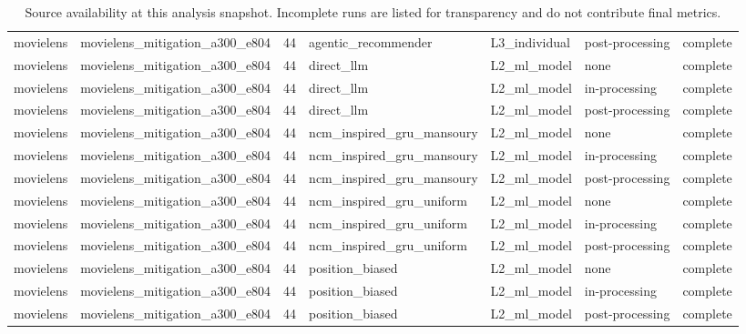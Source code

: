 \begin{table}[htbp!]
\begin{tabular}{llrllll}
movielens & movielens\_mitigation\_a300\_e804 & 44 & agentic\_recommender & L3\_individual & post-processing & complete \\
movielens & movielens\_mitigation\_a300\_e804 & 44 & direct\_llm & L2\_ml\_model & none & complete \\
movielens & movielens\_mitigation\_a300\_e804 & 44 & direct\_llm & L2\_ml\_model & in-processing & complete \\
movielens & movielens\_mitigation\_a300\_e804 & 44 & direct\_llm & L2\_ml\_model & post-processing & complete \\
movielens & movielens\_mitigation\_a300\_e804 & 44 & ncm\_inspired\_gru\_mansoury & L2\_ml\_model & none & complete \\
movielens & movielens\_mitigation\_a300\_e804 & 44 & ncm\_inspired\_gru\_mansoury & L2\_ml\_model & in-processing & complete \\
movielens & movielens\_mitigation\_a300\_e804 & 44 & ncm\_inspired\_gru\_mansoury & L2\_ml\_model & post-processing & complete \\
movielens & movielens\_mitigation\_a300\_e804 & 44 & ncm\_inspired\_gru\_uniform & L2\_ml\_model & none & complete \\
movielens & movielens\_mitigation\_a300\_e804 & 44 & ncm\_inspired\_gru\_uniform & L2\_ml\_model & in-processing & complete \\
movielens & movielens\_mitigation\_a300\_e804 & 44 & ncm\_inspired\_gru\_uniform & L2\_ml\_model & post-processing & complete \\
movielens & movielens\_mitigation\_a300\_e804 & 44 & position\_biased & L2\_ml\_model & none & complete \\
movielens & movielens\_mitigation\_a300\_e804 & 44 & position\_biased & L2\_ml\_model & in-processing & complete \\
movielens & movielens\_mitigation\_a300\_e804 & 44 & position\_biased & L2\_ml\_model & post-processing & complete \\
\hline
\end{tabular}
\caption{Source availability at this analysis snapshot. Incomplete runs are listed for transparency and do not contribute final metrics.}
\label{chap:results:tab:rq4_source_availability}
\end{table}

